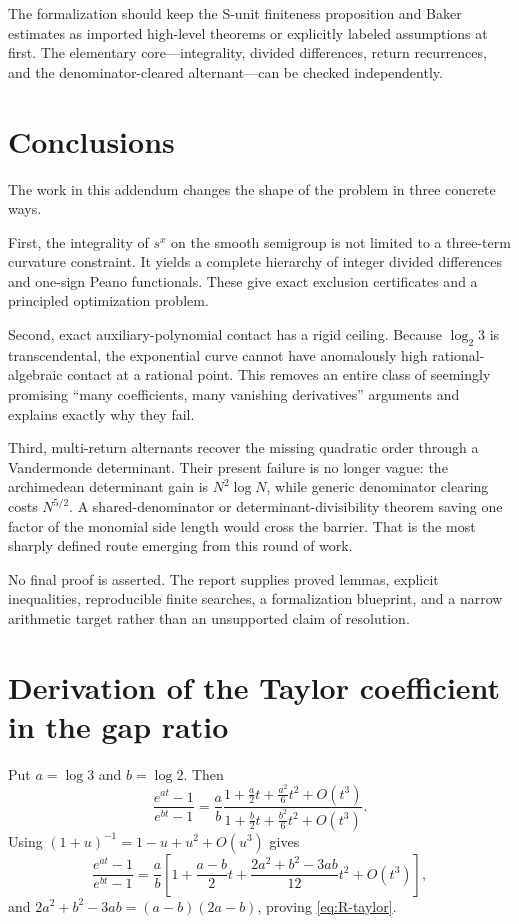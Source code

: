 \documentclass[11pt]{article}
\theoremstyle{definition}
\theoremstyle{remark}
\begin{document}
The formalization should keep the S-unit finiteness proposition and Baker estimates as imported high-level theorems or explicitly labeled assumptions at first. The elementary core---integrality, divided differences, return recurrences, and the denominator-cleared alternant---can be checked independently.

\section{Conclusions}

The work in this addendum changes the shape of the problem in three concrete ways.

First, the integrality of $s^x$ on the smooth semigroup is not limited to a three-term curvature constraint. It yields a complete hierarchy of integer divided differences and one-sign Peano functionals. These give exact exclusion certificates and a principled optimization problem.

Second, exact auxiliary-polynomial contact has a rigid ceiling. Because $\log_2 3$ is transcendental, the exponential curve cannot have anomalously high rational-algebraic contact at a rational point. This removes an entire class of seemingly promising ``many coefficients, many vanishing derivatives'' arguments and explains exactly why they fail.

Third, multi-return alternants recover the missing quadratic order through a Vandermonde determinant. Their present failure is no longer vague: the archimedean determinant gain is $N^2\log N$, while generic denominator clearing costs $N^{5/2}$. A shared-denominator or determinant-divisibility theorem saving one factor of the monomial side length would cross the barrier. That is the most sharply defined route emerging from this round of work.

No final proof is asserted. The report supplies proved lemmas, explicit inequalities, reproducible finite searches, a formalization blueprint, and a narrow arithmetic target rather than an unsupported claim of resolution.

\appendix
\section{Derivation of the Taylor coefficient in the gap ratio}

Put $a=\log3$ and $b=\log2$. Then
\[
 \frac{e^{at}-1}{e^{bt}-1}
 =\frac ab
 \frac{1+\frac a2t+\frac{a^2}{6}t^2+O(t^3)}
 {1+\frac b2t+\frac{b^2}{6}t^2+O(t^3)}.
\]
Using $(1+u)^{-1}=1-u+u^2+O(u^3)$ gives
\[
 \frac{e^{at}-1}{e^{bt}-1}
 =\frac ab\left[
 1+\frac{a-b}{2}t
 +\frac{2a^2+b^2-3ab}{12}t^2+O(t^3)
 \right],
\]
and $2a^2+b^2-3ab=(a-b)(2a-b)$, proving \eqref{eq:R-taylor}.
\end{document}
